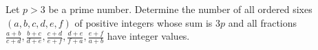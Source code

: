 Let $p> 3$ be a prime number. Determine the number of all ordered sixes $(a, b, c, d, e, f)$ of positive integers whose sum is $3p$ and all fractions $\frac{a + b}{c + d},\frac{b + c}{d + e},\frac{c + d}{e + f},\frac{d + e}{f + a},\frac{e + f}{a + b}$ have integer values.